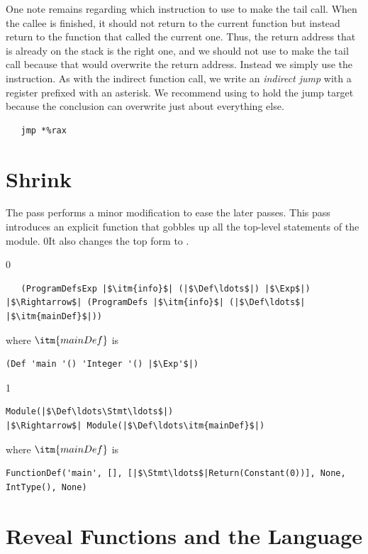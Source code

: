 \documentclass[7x10]{TimesAPriori_MIT}%
\def\racketEd{0}
\def\pythonEd{1}
\providecommand{\BookEdition}{1}
\let\edition\BookEdition
\newcommand{\racket}[1]{{\if\edition\racketEd{#1}\fi}}
\newcommand{\pythonColor}[0]{}
\numberwithin{theorem}{chapter}
\numberwithin{definition}{chapter}
\numberwithin{equation}{chapter}
\begin{document}
One note remains regarding which instruction to use to make the tail
call. When the callee is finished, it should not return to the current
function but instead return to the function that called the current
one. Thus, the return address that is already on the stack is the
right one, and we should not use  to make the tail call
because that would overwrite the return address. Instead we simply use
the  instruction. As with the indirect function call, we write
an \emph{indirect jump} with a register
prefixed with an asterisk.  We recommend using  to hold the
jump target because the conclusion can overwrite just about everything
else.
\begin{lstlisting}
   jmp *%rax
\end{lstlisting}


\section{Shrink \LangFun{}}
\label{sec:shrink-r4}

The  pass performs a minor modification to ease the
later passes. This pass introduces an explicit  function
that gobbles up all the top-level statements of the module.
%
\racket{It also changes the top  form to
\code{ProgramDefs}.}

{\if\edition\racketEd  
\begin{lstlisting}
   (ProgramDefsExp |$\itm{info}$| (|$\Def\ldots$|) |$\Exp$|)
|$\Rightarrow$| (ProgramDefs |$\itm{info}$| (|$\Def\ldots$| |$\itm{mainDef}$|))
\end{lstlisting}
where $\itm{mainDef}$ is
\begin{lstlisting}
(Def 'main '() 'Integer '() |$\Exp'$|)
\end{lstlisting}
\fi}
{\if\edition\pythonEd\pythonColor
\begin{lstlisting}
Module(|$\Def\ldots\Stmt\ldots$|)
|$\Rightarrow$| Module(|$\Def\ldots\itm{mainDef}$|)
\end{lstlisting}
where $\itm{mainDef}$ is
\begin{lstlisting}
FunctionDef('main', [], [|$\Stmt\ldots$|Return(Constant(0))], None, IntType(), None)
\end{lstlisting}
\fi}

\section{Reveal Functions and the \LangFunRef{} Language}
\label{sec:reveal-functions-r4}
\end{document}
